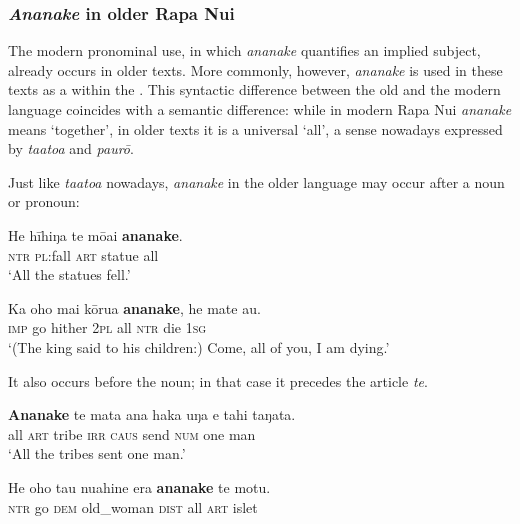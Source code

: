 \subsubsection{\textit{Ananake} in older Rapa Nui}\label{sec:4.4.4.2}

The modern pronominal use, in which \textit{ananake} quantifies an implied subject, already occurs in older texts. More commonly, however, \textit{ananake} is used in these texts as a  within the . This syntactic difference between the old and the modern language coincides with a semantic difference: while in modern Rapa Nui \textit{ananake} means ‘together’, in older texts it is a universal  ‘all’, a sense nowadays expressed by \textit{ta{\ꞌ}ato{\ꞌ}a} and \textit{paurō}.

Just like \textit{ta{\ꞌ}ato{\ꞌ}a} nowadays, \textit{ananake} in the older language may occur after a noun or pronoun:

\ea\label{ex:4.66}
\gll He hīhiŋa te mōai \textbf{ananake}. \\
\textsc{ntr} \textsc{pl}:fall \textsc{art} statue all \\

\glt 
‘All the statues fell.’ \textstyleExampleref{[Mtx-4-05.060]}
\z

\ea\label{ex:4.67}
\gll Ka oho mai kōrua \textbf{ananake}, he mate au. \\
\textsc{imp} go hither \textsc{2pl} all \textsc{ntr} die \textsc{1sg} \\

\glt
‘(The king said to his children:) Come, all of you, I am dying.’ \textstyleExampleref{[Ley-2-08.009]}
\z

It also occurs before the noun; in that case it precedes the article \textit{te}. 

\ea\label{ex:4.68}
\gll \textbf{Ananake} te mata ana haka uŋa e tahi taŋata. \\
all \textsc{art} tribe \textsc{irr} \textsc{caus} send \textsc{num} one man \\

\glt 
‘All the tribes sent one man.’ \textstyleExampleref{[Ley-5-36.001]}
\z

\ea\label{ex:4.69}
\gll He oho tau nuahine era \textbf{ananake} te motu. \\
\textsc{ntr} go \textsc{dem} old\_woman \textsc{dist} all \textsc{art} islet \\

